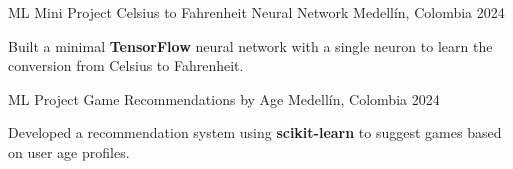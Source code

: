 \begin{cventries}
  \cventry
  {ML Mini Project} %
  {Celsius to Fahrenheit Neural Network} %
  {Medellín, Colombia} %
  {2024} %
  {
    \begin{cvitems}
      \item {Built a minimal \textbf{TensorFlow} neural network with a single neuron to learn the conversion from Celsius to Fahrenheit.}
    \end{cvitems}
  }

  \cventry
  {ML Project} %
  {Game Recommendations by Age} %
  {Medellín, Colombia} %
  {2024} %
  {
    \begin{cvitems}
      \item {Developed a recommendation system using \textbf{scikit-learn} to suggest games based on user age profiles.}
    \end{cvitems}
  }
\end{cventries}
